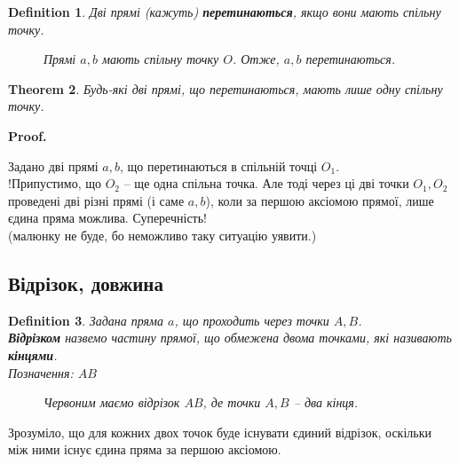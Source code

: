 \documentclass[a4paper, 10pt]{article}
\makeatletter
\theoremstyle{theoremdd}
\newtheorem{theorem}{Theorem}[subsection]
\theoremstyle{theoremdd}
\theoremstyle{theoremdd}
\newtheorem{definition}[theorem]{Definition}
\theoremstyle{theoremdd}
\theoremstyle{theoremdd}
\theoremstyle{theoremdd}
\theoremstyle{theoremdd}
\theoremstyle{theoremdd}
\theoremstyle{theoremdd}
\renewenvironment{proof}[1][Proof.\\]{\par
\pushQED{\hfill \qed}%
\normalfont \topsep6\p@\@plus6\p@\relax
\trivlist
\item\relax
{\bfseries
#1\@addpunct{.}}\hspace\labelsep\ignorespaces
}{%
\popQED\endtrivlist\@endpefalse
}
\makeatother
\begin{document}
\begin{definition}
Дві прямі (кажуть) \textbf{перетинаються}, якщо вони мають спільну точку.
\begin{figure}[H]
\centering
{}
\caption*{Прямі $a,b$ мають спільну точку $O$. Отже, $a,b$ перетинаються.}
\end{figure}
\end{definition}

\begin{theorem}
Будь-які дві прямі, що перетинаються, мають лише одну спільну точку.
\end{theorem}

\begin{proof}
Задано дві прямі $a,b$, що перетинаються в спільній точці $O_1$.\\
!Припустимо, що $O_2$ -- ще одна спільна точка. Але тоді через ці дві точки $O_1,O_2$ проведені дві різні прямі (і саме $a,b$), коли за першою аксіомою прямої, лише єдина пряма можлива. Суперечність!\\
(малюнку не буде, бо неможливо таку ситуацію уявити.)
\end{proof}

\subsection{Відрізок, довжина}
\begin{definition}
Задана пряма $a$, що проходить через точки $A,B$.\\
\textbf{Відрізком} назвемо частину прямої, що обмежена двома точками, які називають \textbf{кінцями}.\\
Позначення: $AB$
\begin{figure}[H]
\centering
{}
\caption*{Червоним маємо відрізок $AB$, де точки $A,B$ -- два кінця.}
\end{figure}
\end{definition}
Зрозуміло, що для кожних двох точок буде існувати єдиний відрізок, оскільки між ними існує єдина пряма за першою аксіомою.
\end{document}

